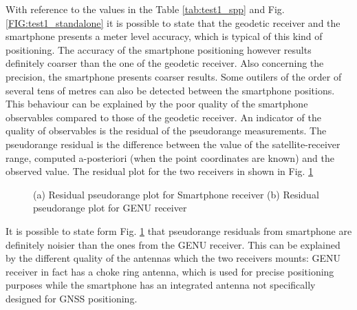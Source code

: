 With reference to the values in the Table \ref{tab:test1_spp} and Fig. \ref{FIG:test1_standalone} it is possible to state that the geodetic receiver and the smartphone presents a meter level accuracy, which is typical of this kind of positioning. The accuracy of the smartphone positioning however results definitely coarser than the one of the geodetic receiver. Also concerning the precision, the smartphone presents coarser results. Some outilers of the order of several tens of metres can also be detected between the smartphone positions. This behaviour can be explained by the poor quality of the smartphone observables compared to those of the geodetic receiver. An indicator of the quality of observables is the residual of the pseudorange measurements. The pseudorange residual is the difference between the value of the satellite-receiver range, computed a-posteriori (when the point coordinates are known) and the observed value. The residual plot for the two receivers in shown in Fig. \ref{FIG:test1_psdrgres}

\begin{figure}[H] 
	\centering
    \caption{(a) Residual pseudorange plot for Smartphone receiver (b) Residual pseudorange plot for GENU receiver}
	\label{FIG:test1_psdrgres} 
\end{figure}

It is possible to state form Fig. \ref{FIG:test1_psdrgres} that pseudorange residuals from smartphone are definitely noisier than the ones from the GENU receiver. This can be explained by the different quality of the antennas which the two receivers mounts: GENU receiver in fact has a choke ring antenna, which is used for precise positioning purposes while the smartphone has an integrated antenna not specifically designed for GNSS positioning.    

